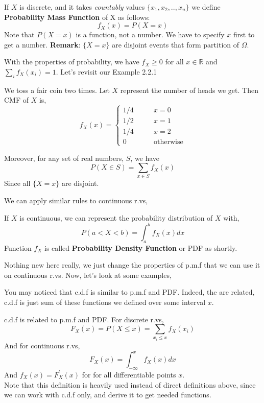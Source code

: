 \begin{definition}
    If $X$ is discrete, and it takes \textit{countably} values $ \{ x_1,x_2,..,x_n \}$ we define \textbf{Probability Mass Function} of X as follows:
    $$f_X(x)= P(X = x)$$
    Note that $P(X = x)$ is a function, not a number. We have to specify $x$ first to get a number.
    \textbf{Remark}: $ \{ X=x \} $ are disjoint events that form partition of $\Omega$.
\end{definition}

   With the properties of probability, we have $f_X \ge 0$ for all $x \in \mathbb{R}$ and $\sum_{i} f_X (x_i) =1 $. Let's revisit our Example 2.2.1

   \begin{example}
    We toss a fair coin two times. Let $X$ represent the number of heads we get. Then CMF of $X$ is,
    \[f_X(x) = 
        \begin{cases} 
          1/4 \qquad &x=0\\
          1/2 \qquad &x=1 \\
          1/4 \qquad &x=2\\
          0 \qquad &\text{otherwise}
        \end{cases} 
\]
\end{example}



Moreover, for any set of real numbers, $S$, we have
\[ P (X \in S) = \sum_{x \in S} f_X(x)\]
Since all $\{X = x \}$  are disjoint.\\
\par
We can apply similar rules to continuous r.vs,
\begin{definition}
    If $X$ is continuous, we can represent the probability distribution of $X$ with,
    \[ P(a < X < b) = \int_{a}^{b} f_X(x) dx \]
    Function  $f_X$ is called \textbf{Probability Density Function} or PDF as shortly.
\end{definition}
Nothing new here really, we just change the properties of p.m.f that we can use it on continuous r.vs. Now, let's look at some examples,\\
\par
You may noticed that c.d.f is similar to p.m.f and PDF. Indeed, the are related, c.d.f is just sum of these functions we defined over some interval $x$.
\begin{definition}
    c.d.f is related to p.m.f and PDF. For discrete r.vs,
    \[F_X(x) = P(X \le x) = \sum_{x_i \le x} f_X(x_i)\]
    And for continuous r.vs,
    \[F_X(x)= \int_{-\infty}^x f_X(x)dx \]
    And $f_X(x) = F_X^{'}(x)$ for for all differentiable points $x$.\\
    Note that this definition is heavily used instead of direct definitions above, since we can work with c.d.f only, and derive it to get needed functions.
\end{definition}
\par



